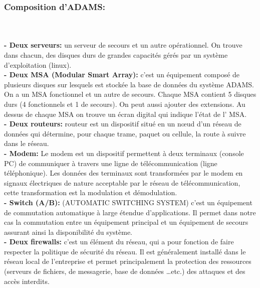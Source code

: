 \subsubsection{Composition d’ADAMS:}
~~\\ 
~~\\
\textbf{- Deux serveurs:} un serveur de secours et un autre opérationnel. On trouve dans chacun, des disques durs de grandes capacités gérés par un système d’exploitation (linux).\\

\textbf{- Deux MSA (Modular Smart Array):} c’est un équipement composé de plusieurs disques sur lesquels est stockée la base de données du système     ADAMS. On  a un MSA fonctionnel et un autre de secours. Chaque MSA contient 5 disques durs (4 fonctionnels et 1 de secours). On peut aussi ajouter des extensions. Au dessus de chaque MSA on trouve un écran digital qui indique l’état de l’ MSA. \\

\textbf{- Deux routeurs:}  routeur est un dispositif situé en un nœud d'un réseau de données qui détermine, pour chaque trame, paquet ou cellule, la route à suivre dans le réseau. \\

\textbf{- Modem:}  Le modem est un dispositif permettent à deux terminaux (console PC) de communiquer à travers une ligne de télécommunication (ligne téléphonique). Les données des terminaux sont transformées par le modem en signaux électriques  de nature acceptable par le réseau de télécommunication, cette transformation est la modulation et démodulation. \\


\textbf{- Switch (A/B):} (AUTOMATIC SWITCHING SYSTEM) c’est un équipement de commutation automatique à large étendue d’applications. Il permet dans notre cas la commutation entre un équipement principal et un équipement de secours assurant ainsi la disponibilité du système. \\


\textbf{- Deux firewalls:} c’est un élément du réseau, qui a pour fonction de faire respecter la politique de sécurité du réseau. Il est généralement installé dans le réseau local de l’entreprise et permet principalement la protection des ressources (serveurs de fichiers, de messagerie, base de données …etc.) des attaques et des accès interdits.\\ 


